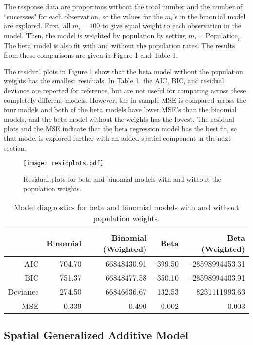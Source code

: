 \documentclass[letterpaper,11pt]{article}
\begin{document}
The response data are proportions without the total number and the number of ``successes" for each observation, so the values for the $m_i$'s in the binomial model are explored. First, all $m_i=100$ to give equal weight to each observation in the model. Then, the model is weighted by population by setting $m_i=\text{Population}_i$. The beta model is also fit with and without the population rates. The results from these comparisons are given in Figure \ref{fig:resplots} and Table \ref{tab:modcomp}.

The residual plots in Figure \ref{fig:resplots} show that the beta model without the population weights has the smallest residuals. In Table \ref{tab:modcomp}, the AIC, BIC, and residual deviance are reported for reference, but are not useful for comparing across these completely different models. However, the in-sample MSE is compared across the four models and both of the beta models have lower MSE's than the binomial models, and the beta model without the weights has the lowest. The residual plots and the MSE indicate that the beta regression model has the best fit, so that model is explored further with an added spatial component in the next section.

\begin{figure}
\centering
\texttt{[image: residplots.pdf]}
\caption{Residual plots for beta and binomial models with and without the population weights.}
\label{fig:resplots}
\end{figure}

\begin{table}[ht]
\small
\centering
\begin{tabular}{rrrrr}
  \hline
 & Binomial & Binomial (Weighted) & Beta & Beta (Weighted) \\ 
  \hline
AIC & 704.70 & 66848430.91 & -399.50 & -28598994453.31 \\ 
  BIC & 751.37 & 66848477.58 & -350.10 & -28598994403.91 \\ 
  Deviance & 274.50 & 66846636.67 & 132.53 & 8231111993.63 \\
  MSE & 0.339 & 0.490 & 0.002 & 0.003 \\ 
   \hline
\end{tabular}
   \caption{Model diagnostics for beta and binomial models with and without population weights.}
   \label{tab:modcomp}
\end{table}

\subsection{Spatial Generalized Additive Model}
\end{document}
